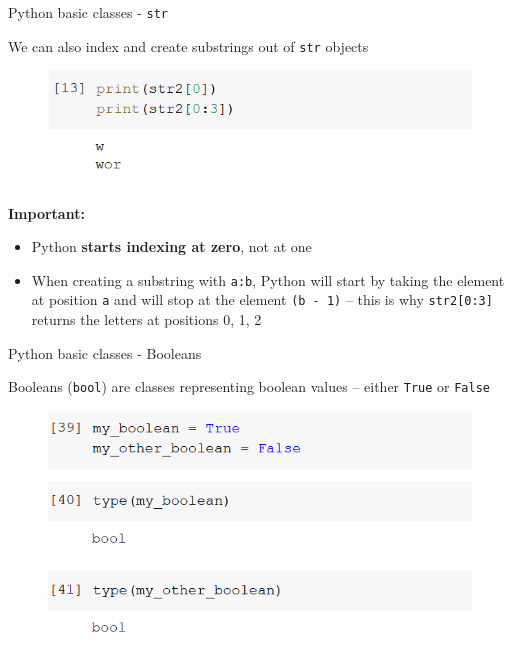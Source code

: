 \documentclass[aspectratio=169]{beamer}
\begin{document}
\begin{frame}{Python basic classes - \texttt{str}}

	We can also index and create substrings out of \texttt{str} objects

	\begin{figure}
		\centering
		\includegraphics[width=0.6\linewidth]{img/string_indexing.png}
	\end{figure}

	\textbf{Important:}

	\begin{itemize}
		\item Python \textbf{starts indexing at zero}, not at one
		\item When creating a substring with \texttt{a:b}, Python will start by taking the element at position \texttt{a} and will stop at the element \texttt{(b - 1)} -- this is why \texttt{str2[0:3]} returns the letters at positions 0, 1, 2
	\end{itemize}

\end{frame}


\begin{frame}{Python basic classes - Booleans}

	Booleans (\texttt{bool}) are classes representing boolean values -- either \texttt{True} or \texttt{False}

	\begin{figure}
		\centering
		\includegraphics[width=0.6\linewidth]{img/bool.png}
	\end{figure}

\end{frame}
\end{document}
